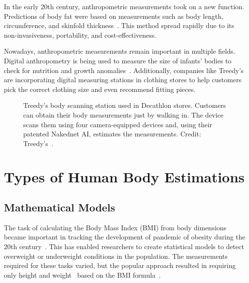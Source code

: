 In the early 20th century, anthropometric measurements took on a new function. Predictions of body fat were based on measurements such as body length, circumference, and skinfold thickness~\cite{anthroHist2}. This method spread rapidly due to its non-invasiveness, portability, and cost-effectiveness.

Nowadays, anthropometric measurements remain important in multiple fields. Digital anthropometry is being used to measure the size of infants' bodies to check for nutrition and growth anomalies~\cite{nutrition}. Additionally, companies like Treedy's~\cite{treedys} are incorporating digital measuring stations in clothing stores to help customers pick the correct clothing size and even recommend fitting pieces.

\begin{figure}
	\caption[Treedy's scanning device]{Treedy's body scanning station used in Decathlon stores. Customers can obtain their body measurements just by walking in. The device scans them using four camera-equipped devices and, using their patented Nakednet AI, estimates the measurements. Credit: Treedy's~\cite{treedys}.}
	\label{treedys}
\end{figure}

\section{Types of Human Body Estimations}
\subsection{Mathematical Models}
The task of calculating the Body Mass Index (BMI) from body dimensions~\cite{bmiPredict} became important in tracking the development of pandemic of obesity during the 20th century~\cite{bmiUsage}. This has enabled researchers to create statistical models to detect overweight or underweight conditions in the population. The measurements required for these tasks varied, but the popular approach resulted in requiring only height and weight~\cite{bmiHW} based on the BMI formula~\cite{bmi}.

